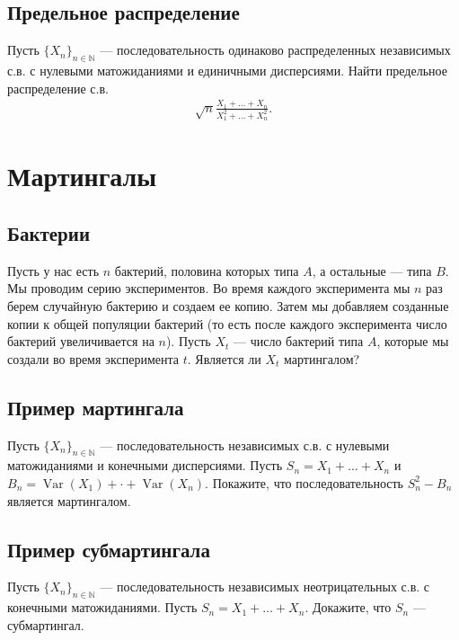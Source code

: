 \documentclass[12pt]{article}
\newcommand\N{\mathbb{N}}
\DeclareMathOperator{\Var}{Var}
\begin{document}
\subsection{Предельное распределение}

Пусть $\{X_n\}_{n \in \N}$ --- последовательность одинаково распределенных независимых с.в. с нулевыми матожиданиями и единичными дисперсиями. Найти предельное распределение с.в.
\begin{align*}
    \sqrt{n}\frac{X_1 + \dots + X_n}{X_1^2 + \dots + X_n^2}.
\end{align*}

\section{Мартингалы}

\subsection{Бактерии}

Пусть у нас есть $n$ бактерий, половина которых типа $A$, а остальные --- типа $B$. Мы проводим серию экспериментов. Во время каждого эксперимента мы $n$ раз берем случайную бактерию и создаем ее копию. Затем мы добавляем созданные копии к общей популяции бактерий (то есть после каждого эксперимента число бактерий увеличивается на $n$). Пусть $X_t$ --- число бактерий типа $A$, которые мы создали во время эксперимента $t$. Является ли $X_t$ мартингалом?

\subsection{Пример мартингала}
Пусть $\{X_n\}_{n \in \N}$ --- последовательность независимых с.в. с нулевыми матожиданиями и конечными дисперсиями. Пусть $S_n = X_1 + \dots + X_n$ и $B_n = \Var(X_1) + \cdot + \Var(X_n)$. Покажите, что последовательность $S_n^2 - B_n$ является мартингалом.

\subsection{Пример субмартингала}

Пусть $\{X_n\}_{n \in \N}$ --- последовательность независимых неотрицательных с.в. с конечными матожиданиями. Пусть $S_n = X_1 + \dots + X_n$. Докажите, что $S_n$ --- субмартингал.
\end{document}

